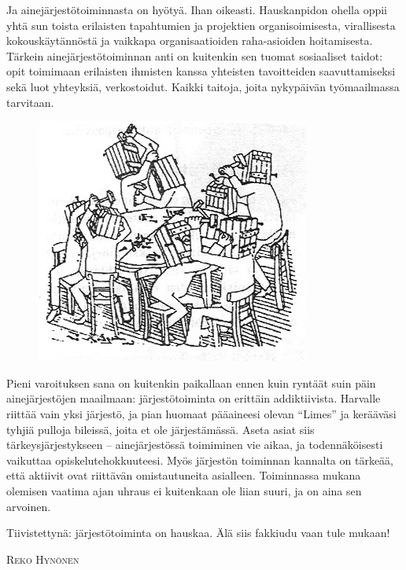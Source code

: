 \documentclass[a5paper, 8pt, twocolumn]{book} %
\numberwithin{equation}{section}
\begin{document}
Ja ainejärjestötoiminnasta on hyötyä.
Ihan oikeasti. Hauskanpidon ohella oppii
yhtä sun toista erilaisten tapahtumien ja
projektien organisoimisesta, virallisesta
kokouskäytännöstä ja vaikkapa organisaatioiden
raha-asioiden hoitamisesta. Tärkein
ainejärjestötoiminnan anti on kuitenkin sen
tuomat sosiaaliset taidot: opit toimimaan
erilaisten ihmisten kanssa yhteisten tavoitteiden
saavuttamiseksi sekä luot yhteyksiä,
verkostoidut. Kaikki taitoja, joita nykypäivän
työmaailmassa tarvitaan.
\begin{figure}[!b]
	\includegraphics[width=\columnwidth]{lautapaa.png}
\end{figure}

Pieni varoituksen sana on kuitenkin paikallaan
ennen kuin ryntäät suin päin ainejärjestöjen
maailmaan: järjestötoiminta on
erittäin addiktiivista. Harvalle riittää vain
yksi järjestö, ja pian huomaat pääaineesi
olevan ``Limes'' ja kerääväsi tyhjiä pulloja
bileissä, joita et ole järjestämässä. Aseta
asiat siis tärkeysjärjestykseen -- ainejärjestössä
toimiminen vie aikaa, ja todennäköisesti
vaikuttaa opiskelutehokkuuteesi.
Myös järjestön toiminnan kannalta on tärkeää,
että aktiivit ovat riittävän omistautuneita
asialleen. Toiminnassa mukana olemisen
vaatima ajan uhraus ei kuitenkaan
ole liian suuri, ja on aina sen arvoinen.

Tiivistettynä: järjestötoiminta on hauskaa.
Älä siis fakkiudu vaan tule mukaan!

\vspace{0.5cm}\noindent\textsc{Reko Hynönen}
\end{document}
